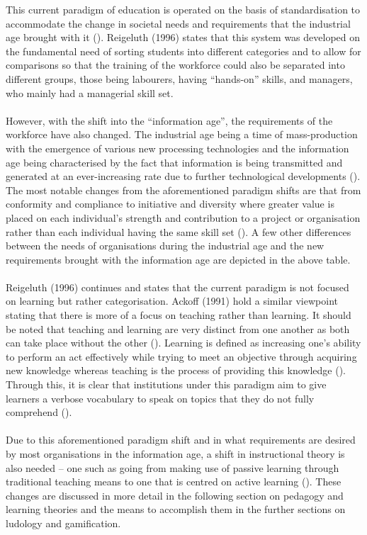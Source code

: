 This current paradigm of education is operated on the basis of standardisation to accommodate the change in societal needs and requirements that the industrial age brought with it (\cite{Reigeluth1996}). Reigeluth (1996) states that this system was developed on the fundamental need of sorting students into different categories and to allow for comparisons so that the training of the workforce could also be separated into different groups, those being labourers, having “hands-on” skills, and managers, who mainly had a managerial skill set. 
\\\\
However, with the shift into the “information age”, the requirements of the workforce have also changed. The industrial age being a time of mass-production with the emergence of various new processing technologies and the information age being characterised by the fact that information is being transmitted and generated at an ever-increasing rate due to further technological developments (\cite{gibson2006games, Reigeluth1996}). The most notable changes from the aforementioned paradigm shifts are that from conformity and compliance to initiative and diversity where greater value is placed on each individual’s strength and contribution to a project or organisation rather than each individual having the same skill set (\cite{Reigeluth1996}).  A few other differences between the needs of organisations during the industrial age and the new requirements brought with the information age are depicted in the above table.
\\\\
Reigeluth (1996) continues and states that the current paradigm is not focused on learning but rather categorisation. Ackoff (1991) hold a similar viewpoint stating that there is more of a focus on teaching rather than learning. It should be noted that teaching and learning are very distinct from one another as both can take place without the other (\cite{Ackoff1991}). Learning is defined as increasing one’s ability to perform an act effectively while trying to meet an objective through acquiring new knowledge whereas teaching is the process of providing this knowledge (\cite{Ackoff1991}). Through this, it is clear that institutions under this paradigm aim to give learners a verbose vocabulary to speak on topics that they do not fully comprehend (\cite{Ackoff1991}). 
\\\\
Due to this aforementioned paradigm shift and in what requirements are desired by most organisations in the information age, a shift in instructional theory is also needed – one such as going from making use of passive learning through traditional teaching means to one that is centred on active learning (\cite{Reigeluth1996}). These changes are discussed in more detail in the following section on pedagogy and learning theories and the means to accomplish them in the further sections on ludology and gamification.

